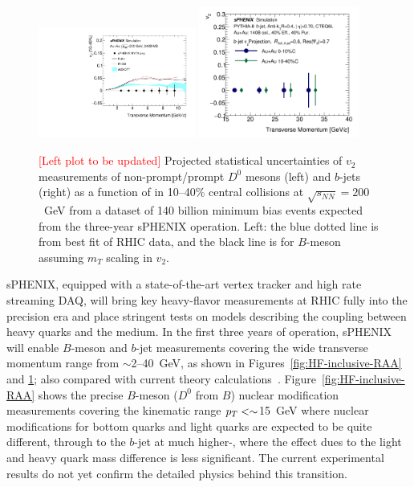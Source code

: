 \begin{figure}[htbp]
\centering
\includegraphics[width=0.46\textwidth]{figs/v2_proj_240B_theory.pdf}
\includegraphics[width=0.47\textwidth]{figs/200pp_pythia8_CTEQ6L_7GeV_ALL_cfg_eneg_DSTReader_root_Draw_HFJetTruth_CrossSection2v2_3yr_EPR0_7_deta0_70.pdf}
\caption{ {\textcolor{red}{[Left plot to be updated]}} Projected statistical uncertainties of $v_2$ measurements of
  non-prompt/prompt $D^0$ mesons (left) and $b$-jets (right) as a
  function of \pT in 10--40\% central \auau collisions at
  $\sqrt{s_{NN}}=200$~GeV from a dataset of 140 billion minimum bias
  \auau events expected from the three-year sPHENIX operation.  Left:
  the blue dotted line is from best fit of RHIC data, and the black
  line is for $B$-meson assuming $m_T$ scaling in
  $v_2$. \cite{Adamczyk:2017xur, Duke, TAMU, PHSD}}
\label{fig:HF-v2}
\end{figure}

sPHENIX, equipped with a state-of-the-art vertex tracker and high rate
streaming DAQ, will bring key heavy-flavor measurements at RHIC fully
into the precision era and place stringent tests on models describing
the coupling between heavy quarks and the medium. In the first three
years of operation, sPHENIX will enable $B$-meson and $b$-jet
measurements covering the wide transverse momentum range from
$\sim$2--40~GeV, as shown in Figures~\ref{fig:HF-inclusive-RAA} and
\ref{fig:HF-v2}; also compared with current theory
calculations~\cite{Duke,TAMU,PHSD,CUJET,Huang:2013vaa,Ke:2020nsm}.  
Figure~\ref{fig:HF-inclusive-RAA} shows the precise $B$-meson ($D^{0}$ from $B$) nuclear
modification measurements covering the kinematic range $\mbox{${p_T}$} <\sim$15~GeV where
nuclear modifications for bottom quarks and light quarks are expected
to be quite different, through to the $b$-jet at much higher-\pT,
where the effect dues to the light and heavy quark mass difference is
less significant.  The current experimental results do not yet confirm
the detailed physics behind this transition.  

